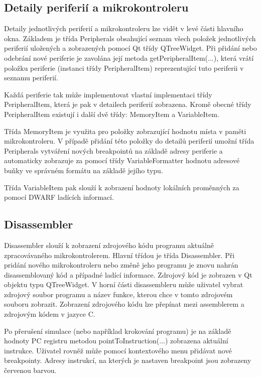 \subsection{Detaily periferií a mikrokontroleru}
\label{detaily_per}

Detaily jednotlivých periferií a mikrokontroleru lze vidět v levé části hlavního okna. Základem je třída Peripherals obsahující seznam všech položek jednotlivých periferií uložených a zobrazených pomocí Qt třídy QTreeWidget. Při přidání nebo odebrání nové periferie je zavolána její metoda getPeripheralItem(...), která vrátí položku periferie (instanci třídy PeripheralItem) reprezentující tuto periferii v seznamu periferií.

Každá periferie tak může implementovat vlastní implementaci třídy PeripheralItem, která je pak v detailech periferií zobrazena. Kromě obecné třídy PeripheralItem existují i další dvě třídy: MemoryItem a VariableItem.

Třída MemoryItem je využita pro položky zobrazující hodnotu místa v paměti mikrokontroleru. V případě přidání této položky do detailů periferií umožní třída Peripherals vytváření nových breakpointů na základě adresy periferie a automaticky zobrazuje za pomocí třídy VariableFormatter hodnotu adresové buňky ve správném formátu na základě jejího typu.

Třída VariableItem pak slouží k zobrazení hodnoty lokálních proměnných za pomocí DWARF ladících informací.

\subsection{Disassembler}
\label{screen_disassembler}

Disassembler slouží k zobrazení zdrojového kódu programu aktuálně zpracovávaného mikrokontrolerem. Hlavní třídou je třída Disassembler. Při pridání nového mikrokontroleru nebo změně jeho programu je znovu nahrán disassemblovaný kód a případné ladící informace. Zdrojový kód je zobrazen v Qt objektu typu QTreeWidget. V horní části disassembleru může uživatel vybrat zdrojový soubor programu a název funkce, kterou chce v tomto zdrojovém souboru zobrazit. Zobrazení zdrojového kódu lze přepínat mezi assemblerem a zdrojovým kódem v jazyce C.

Po přerušení simulace (nebo například krokování programu) je na základě hodnoty PC registru metodou pointToInstruction(...) zobrazena aktuální instrukce. Uživatel rovněž může pomocí kontextového menu přidávat nové breakpointy. Adresy instrukcí, na kterých je nastaven breakpoint jsou zobrazeny červenou barvou.

